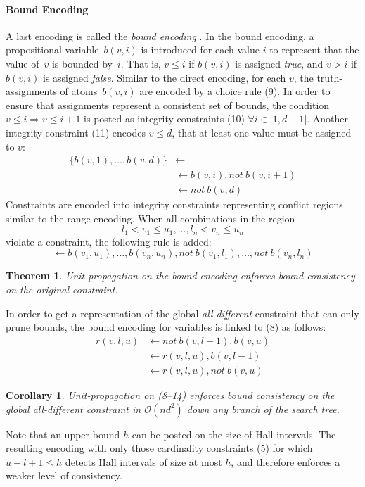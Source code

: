 \documentclass[letterpaper]{article}
\newtheorem{theorem}{Theorem}
\newtheorem{corollary}{Corollary}[theorem]
\newcommand{\dneg}{not\ }
\begin{document}
\paragraph{Bound Encoding}
A last encoding is called the \emph{bound encoding} \cite{crba94a}. In the bound encoding, a propositional variable~$b(v, i)$ is introduced for each value $i$ to represent that the value of~$v$ is bounded by~$i$. That is, $v \leq i$ if $b(v,i)$ is assigned \emph{true}, and $v > i$ if $b(v,i)$ is assigned \emph{false}. Similar to the direct encoding, for each $v$, the truth-assignments of atoms~$b(v, i)$ are encoded by a choice rule (9). In order to ensure that assignments represent a consistent set of bounds, the condition $v \leq i \Rightarrow v \leq i+1$ is posted as integrity constraints (10) $\forall i \in \lbrack 1, d-1 \rbrack$. Another integrity constraint (11) encodes $v \leq d$, that at least one value must be assigned to $v$:
\begin{align}
\{ b(v, 1), \dots, b(v, d) \} &\leftarrow \\
&\leftarrow  b(v, i), \dneg b(v, i+1) \\
&\leftarrow \dneg b(v, d)
\end{align}
Constraints are encoded into integrity constraints representing conflict regions similar to the range encoding. When all combinations in the region
\[
l_1 < v_1 \leq u_1, \dots, l_n < v_n \leq u_n
\]
violate a constraint, the following rule is added:
\[
\leftarrow b(v_1, u_1), \dots, b(v_n, u_n), \dneg b(v_1, l_1), \dots, \dneg b(v_n, l_n)
\]
\begin{theorem}
Unit-propagation on the bound encoding enforces bound consistency on the original constraint.
\end{theorem}
In order to get a representation of the global \emph{all-different} constraint that can only prune bounds, the bound encoding for variables is linked to (8) as follows:
\begin{align}
r(v, l, u) &\leftarrow \dneg b(v, l-1), b(v, u) \\
&\leftarrow r(v, l, u), b(v, l-1) \\
&\leftarrow r(v, l, u), \dneg b(v, u)
\end{align}
\begin{corollary}
Unit-propagation on (8--14) enforces bound consistency on the global \emph{all-different} constraint in $\mathcal{O}(nd^2)$ down any branch of the search tree.
\end{corollary}
Note that an upper bound $h$ can be posted on the size of Hall intervals. The resulting encoding with only those cardinality constraints (5) for which $u - l + 1 \leq h$ detects Hall intervals of size at most $h$, and therefore enforces a weaker level of consistency.
\end{document}
